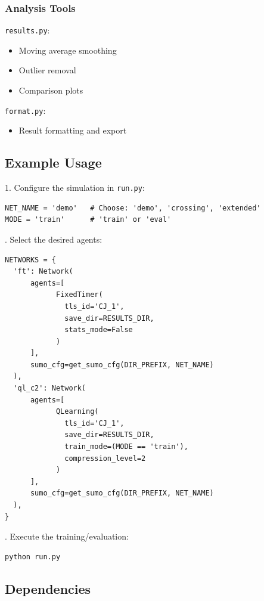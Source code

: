 \documentclass[a4paper]{report}
\begin{document}
\subsubsection{Analysis Tools}

\texttt{results.py}:
\begin{itemize}
    \item Moving average smoothing
    \item Outlier removal
    \item Comparison plots
\end{itemize}

\noindent
\texttt{format.py}:
\begin{itemize}
    \item Result formatting and export
\end{itemize}

\subsection{Example Usage}

1. Configure the simulation in \texttt{run.py}:

\begin{lstlisting}[style=pythonstyle]
NET_NAME = 'demo'   # Choose: 'demo', 'crossing', 'extended'
MODE = 'train'      # 'train' or 'eval'
\end{lstlisting}

. Select the desired agents:

\begin{lstlisting}[style=pythonstyle]
NETWORKS = {
  'ft': Network(
      agents=[
            FixedTimer(
              tls_id='CJ_1',
              save_dir=RESULTS_DIR,
              stats_mode=False
            )
      ],
      sumo_cfg=get_sumo_cfg(DIR_PREFIX, NET_NAME)
  ),
  'ql_c2': Network(
      agents=[
            QLearning(
              tls_id='CJ_1',
              save_dir=RESULTS_DIR,
              train_mode=(MODE == 'train'),
              compression_level=2
            )
      ],
      sumo_cfg=get_sumo_cfg(DIR_PREFIX, NET_NAME)
  ),
}
\end{lstlisting}

. Execute the training/evaluation:

\begin{lstlisting}[language=bash]
   python run.py
\end{lstlisting}

\subsection{Dependencies}
\end{document}
